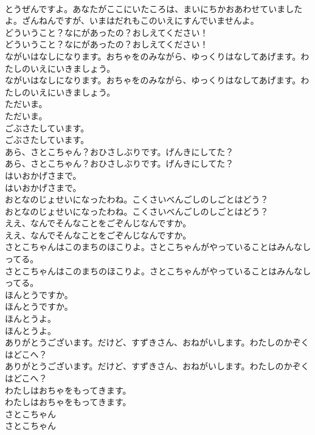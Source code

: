 \documentclass[8pt]{extreport}
\begin{document}
\begin{CJK}{UTF8}{min}
\\	とうぜんですよ。あなたがここにいたころは、まいにちかおあわせていましたよ。ざんねんですが、いまはだれもこのいえにすんでいませんよ。 
\\	どういうこと？なにがあったの？おしえてください！	
\\	どういうこと？なにがあったの？おしえてください！ 
\\	ながいはなしになります。おちゃをのみながら、ゆっくりはなしてあげます。わたしのいえにいきましょう。	
\\	ながいはなしになります。おちゃをのみながら、ゆっくりはなしてあげます。わたしのいえにいきましょう。 
\\	ただいま。	
\\	ただいま。 
\\	ごぶさたしています。	
\\	ごぶさたしています。 
\\	あら、さとこちゃん？おひさしぶりです。げんきにしてた？	
\\	あら、さとこちゃん？おひさしぶりです。げんきにしてた？ 
\\	はいおかげさまで。	
\\	はいおかげさまで。 
\\	おとなのじょせいになったわね。こくさいべんごしのしごとはどう？	
\\	おとなのじょせいになったわね。こくさいべんごしのしごとはどう？ 
\\	ええ、なんでそんなことをごぞんじなんですか。	
\\	ええ、なんでそんなことをごぞんじなんですか。 
\\	さとこちゃんはこのまちのほこりよ。さとこちゃんがやっていることはみんなしってる。	
\\	さとこちゃんはこのまちのほこりよ。さとこちゃんがやっていることはみんなしってる。 
\\	ほんとうですか。	
\\	ほんとうですか。 
\\	ほんとうよ。	
\\	ほんとうよ。 
\\	ありがとうございます。だけど、すずきさん、おねがいします。わたしのかぞくはどこへ？	
\\	ありがとうございます。だけど、すずきさん、おねがいします。わたしのかぞくはどこへ？ 
\\	わたしはおちゃをもってきます。	
\\	わたしはおちゃをもってきます。 
\\	さとこちゃん	
\\	さとこちゃん 

\end{CJK}
\end{document}
